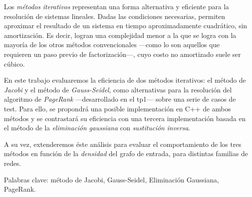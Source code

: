 Los \textit{métodos iterativos} representan una forma alternativa y eficiente para la resolución de sistemas lineales. Dadas las condiciones necesarias, permiten aproximar el resultado de un sistema en tiempo aproximadamente cuadrático, sin amortización. Es decir, logran una complejidad  menor a la que se logra con la mayoría de los otros métodos convencionales ---como lo son aquellos que requieren un paso previo de factorización---, cuyo costo no amortizado suele ser cúbico.

\vspace{1em}
En este trabajo evaluaremos la eficiencia de dos métodos iterativos: el método de \textit{Jacobi} y el método de \textit{Gauss-Seidel}, como alternativas para la resolución del algoritmo de \textit{PageRank} ---desarrollado en el tp1--- sobre una serie de casos de test. Para ello, se propondrá una posible implementación en C++ de ambos métodos y se contrastará su eficiencia con una tercera implementación basada en el método de la \textit{eliminación gaussiana} con \textit{sustitución inversa}.

A su vez, extenderemos éste análisis para evaluar el comportamiento de los tres métodos en función de la \textit{densidad} del grafo de entrada, para distintas familias de redes. 

\vspace{1em}
\noindent Palabras clave: método de Jacobi, Gauss-Seidel, Eliminación Gaussiana, PageRank.
